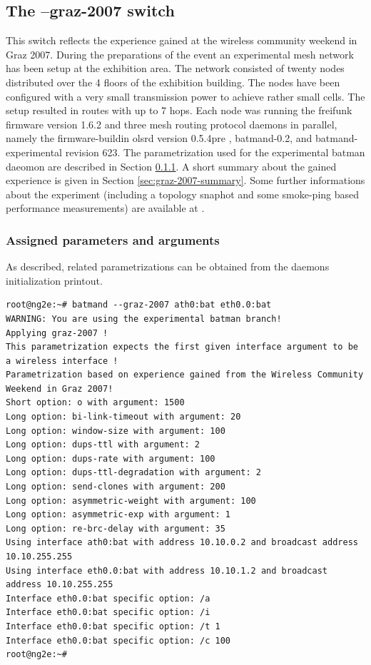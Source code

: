 \documentclass[11pt]{article}
\begin{document}
\subsection{The --graz-2007 switch}
\label{sec:graz-2007}

This switch reflects the experience gained at the wireless community weekend in Graz 2007.
During the preparations of the event an experimental mesh network has been setup at the exhibition area.
The network consisted of twenty nodes distributed over the 4 floors of the exhibition building.
The nodes have been configured with a very small transmission power to achieve rather small cells.
The setup resulted in routes with up to 7 hops.
Each node was running the freifunk firmware \cite{freifunk-firmware} version 1.6.2 and three mesh routing protocol daemons in parallel, namely the firmware-buildin olsrd version 0.5.4pre \cite{olsr-org}, batmand-0.2, and batmand-experimental revision 623.
The parametrization used for the experimental batman daeomon are described in Section \ref{sec:graz-2007-parameters}.
A short summary about the gained experience is given in Section \ref{sec:graz-2007-summary}.
%
Some further informations about the experiment (including a topology snaphot and some smoke-ping based performance measurements) are available at \cite{graz-experience}.


\subsubsection{Assigned parameters and arguments}
\label{sec:graz-2007-parameters}

As described, related parametrizations can be obtained from the daemons initialization printout.


\begin{small} \begin{verbatim}
root@ng2e:~# batmand --graz-2007 ath0:bat eth0.0:bat
WARNING: You are using the experimental batman branch!
Applying graz-2007 !
This parametrization expects the first given interface argument to be a wireless interface !
Parametrization based on experience gained from the Wireless Community Weekend in Graz 2007!
Short option: o with argument: 1500
Long option: bi-link-timeout with argument: 20
Long option: window-size with argument: 100
Long option: dups-ttl with argument: 2
Long option: dups-rate with argument: 100
Long option: dups-ttl-degradation with argument: 2
Long option: send-clones with argument: 200
Long option: asymmetric-weight with argument: 100
Long option: asymmetric-exp with argument: 1
Long option: re-brc-delay with argument: 35
Using interface ath0:bat with address 10.10.0.2 and broadcast address 10.10.255.255
Using interface eth0.0:bat with address 10.10.1.2 and broadcast address 10.10.255.255
Interface eth0.0:bat specific option: /a
Interface eth0.0:bat specific option: /i
Interface eth0.0:bat specific option: /t 1
Interface eth0.0:bat specific option: /c 100
root@ng2e:~#
\end{verbatim} \end{small}
\end{document}
